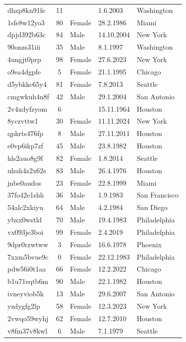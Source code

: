 \documentclass[a4paper, 12pt, notitlepage]{report}
\begin{document}
\begin{longtable}{l c l l l}
        dhzp8kn91fe & 11 &  & 1.6.2003 & Washington \\
        1sfe8w12yo3 & 80 & Female & 28.2.1986 & Miami \\
        dpjd392b63c & 84 & Male & 14.10.2004 & New York \\
        90onzs31iii & 35 & Male & 8.1.1997 & Washington \\
        4ungjt0prp & 98 & Female & 27.6.2023 & New York \\
        o9ea4dgpfe & 5 & Female & 21.1.1995 & Chicago \\
        d5ybkkc65y4 & 81 & Female & 7.8.2013 & Seattle \\
        cmgwkuh4n8f & 42 & Male & 29.1.2004 & San Antonio \\
        2v4xdyfzyom & 6 &  & 15.11.1964 & Houston \\
        8yczvttw1 & 30 & Female & 11.11.2024 & New York \\
        qpkrts476fp & 8 & Male & 27.11.2011 & Houston \\
        e0vp6ikp7zf & 45 & Male & 23.8.1982 & Houston \\
        hls2auo8g9f & 82 & Female & 1.8.2014 & Seattle \\
        uhuh4z2x62s & 83 & Male & 26.4.1976 & Houston \\
        jnbe0audos & 23 & Female & 22.8.1999 & Miami \\
        37fo42e1shh & 36 & Male & 1.9.1983 & San Francisco \\
        54alc2xkiyu & 64 & Male & 4.2.1984 & San Diego \\
        ybxx0wstld & 70 & Male & 19.4.1983 & Philadelphia \\
        vx093je3boi & 99 & Female & 2.4.2019 & Philadelphia \\
        9dpr0rzwtww & 3 & Female & 16.6.1978 & Phoenix \\
        7xxm5bvue9c & 0 & Female & 22.12.1983 & Philadelphia \\
        pdw56i0t1aa & 66 & Female & 12.2.2022 & Chicago \\
        b1u71eqtb6m & 90 & Male & 22.1.1982 & Houston \\
        ivneyviob5k & 13 & Male & 29.6.2007 & San Antonio \\
        yzdygfg2lp & 58 & Female & 12.3.2023 & New York \\
        2vwqo59wyhj & 62 & Female & 12.7.2010 & Houston \\
        v8fm37v8kwl & 6 & Male & 7.1.1979 & Seattle \\

\end{longtable}
\end{document}
